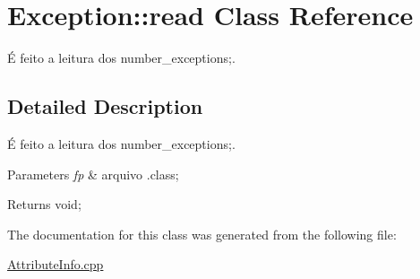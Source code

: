 \hypertarget{class_exception_1_1read}{}\section{Exception\+:\+:read Class Reference}
\label{class_exception_1_1read}


É feito a leitura dos number\+\_\+exceptions;.  




\subsection{Detailed Description}
É feito a leitura dos number\+\_\+exceptions;. 


\begin{DoxyParams}{Parameters}
{\em fp} & arquivo .class; \\
\hline
\end{DoxyParams}
\begin{DoxyReturn}{Returns}
void; 
\end{DoxyReturn}


The documentation for this class was generated from the following file\+:\begin{DoxyCompactItemize}
\item 
\hyperlink{_attribute_info_8cpp}{Attribute\+Info.\+cpp}\end{DoxyCompactItemize}
